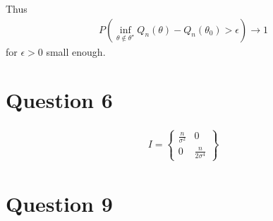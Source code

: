 Thus
\begin{align}
  \label{eq:4}
  P(\inf_{\theta \notin \theta^{\star}} Q_{n}(\theta) -
  Q_{n}(\theta_{0}) > \epsilon) \rightarrow 1
\end{align} for $\epsilon > 0$ small enough.


\section{Question 6}
\label{sec:question-6}

\begin{align}
  \label{eq:6}
  I =
  \begin{Bmatrix}
    \frac{n}{\sigma^{2}} & 0  \\
    0 & \frac{n}{2\sigma^{4}}
  \end{Bmatrix}
\end{align}

\section{Question 9}
\label{sec:question-9}


